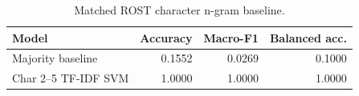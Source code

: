 \begin{table}[t]
\centering
\caption{Matched ROST character n-gram baseline.}
\label{tab:rost-char-ngram-baseline}
\begin{tabular}{lrrr}
\toprule
Model & Accuracy & Macro-F1 & Balanced acc. \\
\midrule
Majority baseline & 0.1552 & 0.0269 & 0.1000 \\
Char 2--5 TF-IDF SVM & 1.0000 & 1.0000 & 1.0000 \\
\bottomrule
\end{tabular}
\end{table}
